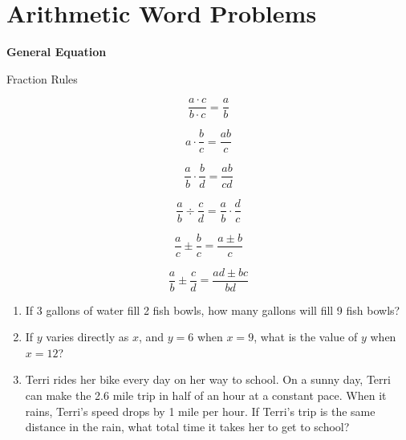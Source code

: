 \section{Arithmetic Word Problems}

\bigskip
\textbf{General Equation}

\bigskip
\begin{equationbox}{Fraction Rules}
\setlength{\columnseprule}{0pt}
\begin{spacing}{1.5}
\begin{multicols}{3}
\[\frac{a\cdot c}{b\cdot c}=\frac{a}{b}\]

\[a\cdot \frac{b}{c}=\frac{ab}{c}\]

\[\frac{a}{b}\cdot\frac{b}{d}=\frac{ab}{cd}\]

\[\frac{a}{b}\div\frac{c}{d}=\frac{a}{b}\cdot\frac{d}{c}\]

\[\frac{a}{c}\pm\frac{b}{c}=\frac{a\pm b}{c}\]

\[\frac{a}{b}\pm\frac{c}{d}=\frac{ad\pm bc}{bd}\]
\end{multicols}
\end{spacing}
\end{equationbox}

\begin{enumerate}[labelindent=*,style=multiline,leftmargin=*,label=\textbf{Example \arabic*:}]
\item If 3 gallons of water fill 2 fish bowls, how many gallons will fill 9 fish bowls?

\vfill\item If $y$ varies directly as $x$, and $y=6$ when $x=9$, what is the value of $y$ when $x=12$?

\vfill\item Terri rides her bike every day on her way to school. On a sunny day, Terri can make the 2.6 mile trip in half of an hour at a constant pace. When it rains, Terri's speed drops by 1 mile per hour. If Terri's trip is the same distance in the rain, what total time it takes her to get to school?
\end{enumerate}

